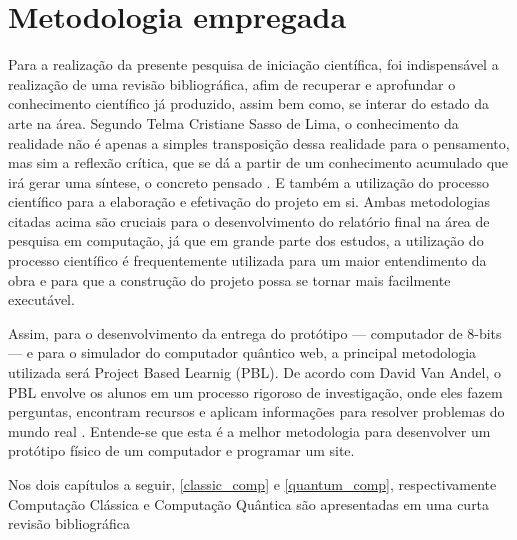 \section{Metodologia empregada}
\label{methodologies}
Para a realização da presente pesquisa de iniciação científica, foi indispensável a realização de uma revisão bibliográfica, afim de recuperar e aprofundar o conhecimento científico já produzido, assim bem como, se interar do estado da arte na área. Segundo Telma Cristiane Sasso de Lima, o conhecimento da realidade não é apenas a simples transposição dessa realidade para o pensamento, mas sim a reflexão crítica, que se dá a partir de um conhecimento acumulado que irá gerar uma síntese, o concreto pensado \cite{1}. E também a utilização do processo científico para a elaboração e efetivação do projeto em si. Ambas metodologias citadas acima são cruciais para o desenvolvimento do relatório final na área de pesquisa em computação, já que em grande parte dos estudos, a utilização do processo científico é frequentemente utilizada para um maior entendimento da obra e para que a construção do projeto possa se tornar mais facilmente executável.

Assim, para o desenvolvimento da entrega do protótipo — computador de 8-bits — e para o simulador do computador quântico web, a principal metodologia utilizada será Project Based Learnig (PBL). De acordo com David Van Andel, o PBL envolve os alunos em um processo rigoroso de investigação, onde eles fazem perguntas, encontram recursos e aplicam informações para resolver problemas do mundo real \cite{3}. Entende-se que esta é a melhor metodologia para desenvolver um protótipo físico de um computador e programar um site.

Nos dois capítulos a seguir, \ref{classic_comp} e \ref{quantum_comp}, respectivamente Computação Clássica e Computação Quântica são apresentadas em uma curta revisão bibliográfica 

\newpage